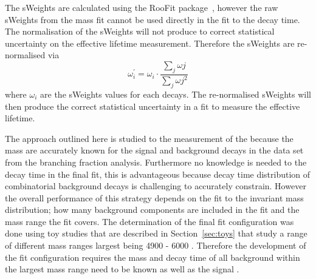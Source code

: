The sWeights are calculated using the RooFit package~\cite{Verkerke:2003ir,}, however the raw sWeights from the mass fit cannot be used directly in the \ml fit to the decay time. The normalisation of the sWeights will not produce to correct statistical uncertainty on the effective lifetime measurement. Therefore the sWeights are re-normalised via
\begin{equation}
\omega^{'}_{i}= \omega_{i} \cdot \frac{\displaystyle\sum_{j} \omega{j}}{\displaystyle\sum_{j} \omega{j}^{2}}
\end{equation}
where $\omega_{i}$ are the sWeights values for each decays. The re-normalised sWeights will then produce the correct statistical uncertainty in a \ml fit to measure the \bsmumu effective lifetime.

The approach outlined here is studied to the measurement of the \bsmumu \el because the mass \pdfs are accurately known for the signal and background decays in the data set from the branching fraction analysis. Furthermore no knowledge is needed to the decay time \pdfs in the final fit, this is advantageous because decay time distribution of combinatorial background decays is challenging to accurately constrain. 
However the overall performance of this strategy depends on the \ml fit to the invariant mass distribution; how many background components are included in the fit and the mass range the fit covers. The determination of the final fit configuration was done using toy studies that are described in Section~\ref{sec:toys} that study a range of different mass ranges largest being 4900 - 6000 \mevcc. Therefore the development of the fit configuration requires the mass and decay time \pdfs of all background within the largest mass range need to be known as well as the signal \pdfs. 




